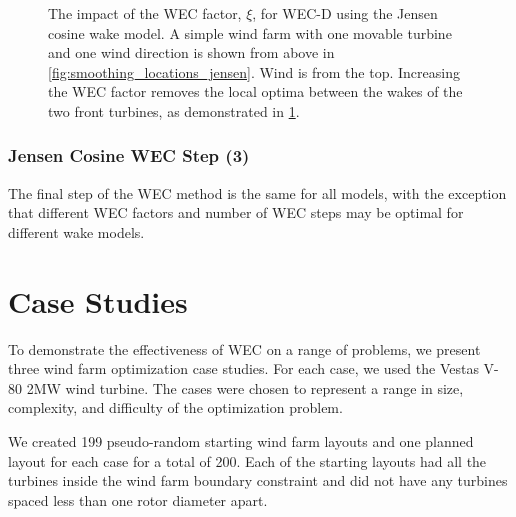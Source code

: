 \documentclass[journal abbreviation, manuscript]{copernicus}
\begin{document}
\begin{figure}[h!]
\begin{subfigure}[t]{0.47\textwidth}
			\caption{}
			\label{fig:smoothing_jensen_wec_d}
		\end{subfigure}
		\caption{The impact of the WEC factor, $\xi$, for WEC-D using the Jensen cosine wake model. A simple wind farm with one movable turbine and one wind direction is shown from above in \ref{fig:smoothing_locations_jensen}. Wind is from the top. Increasing the WEC factor removes the local optima between the wakes of the two front turbines, as demonstrated in \ref{fig:smoothing_jensen_wec_d}.}
		\label{fig:wec_jensen_wec_d}
	\end{figure}
	
	\subsubsection{Jensen Cosine WEC Step (3)}
	
	The final step of the WEC method is the same for all models, with the exception that different WEC factors and number of WEC steps may be optimal for different wake models.
	
	\section{Case Studies}\label{sec:casestudies}
	To demonstrate the effectiveness of WEC on a range of problems, we present three wind farm optimization case studies. For each case, we used the Vestas V-80 2MW wind turbine. The cases were chosen to represent a range in size, complexity, and difficulty of the optimization problem.
	
	We created 199 pseudo-random starting wind farm layouts and one planned layout for each case for a total of 200. Each of the starting layouts had all the turbines inside the wind farm boundary constraint and did not have any turbines spaced less than one rotor diameter apart.
	
\end{document}
